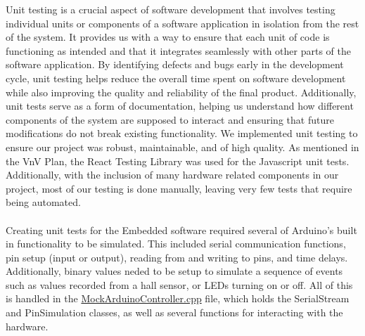 \documentclass[12pt, titlepage]{article}
\begin{document}
  Unit testing is a crucial aspect of software development that involves testing individual units or components of a software application in isolation from the rest of the system. It provides us with a way to ensure that each unit of code is functioning as intended and that it integrates seamlessly with other parts of the software application. By identifying defects and bugs early in the development cycle, unit testing helps reduce the overall time spent on software development while also improving the quality and reliability of the final product. Additionally, unit tests serve as a form of documentation, helping us understand how different components of the system are supposed to interact and ensuring that future modifications do not break existing functionality. We implemented unit testing to ensure our project was robust, maintainable, and of high quality. As mentioned in the VnV Plan, the React Testing Library was used for the Javascript unit tests. Additionally, with the inclusion of many hardware related components in our project, most of our testing is done manually, leaving very few tests that require being automated. 
  \\\\
  Creating unit tests for the Embedded software required several of Arduino's built in functionality to be simulated. This included serial communication functions,
  pin setup (input or output), reading from and writing to pins, and time delays. Additionally, binary values neded to be setup to simulate a sequence of events 
  such as values recorded from a hall sensor, or LEDs turning on or off. All of this is handled in the 
  \href{../../test/EmbeddedTest/ArduinoTest/MockArduinoController.cpp}{MockArduinoController.cpp} file, which holds the SerialStream and PinSimulation classes,
  as well as several functions for interacting with the hardware.
\end{document}
